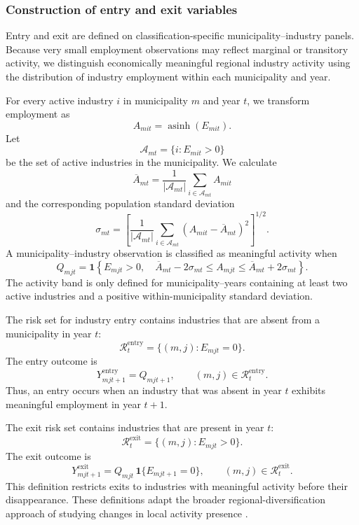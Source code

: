 \documentclass[9pt,twoside]{pnas-new}
\begin{document}
\subsubsection{Construction of entry and exit variables}
\label{subsubsec:regional_entry_exit}

Entry and exit are defined on classification-specific
municipality--industry panels. Because very small employment observations may
reflect marginal or transitory activity, we distinguish economically
meaningful regional industry activity using the distribution of industry
employment within each municipality and year.

For every active industry \(i\) in municipality \(m\) and year \(t\), we
transform employment as
\[
A_{mit}=\operatorname{asinh}(E_{mit}).
\]
Let
\[
\mathcal{A}_{mt}=\{i:E_{mit}>0\}
\]
be the set of active industries in the municipality. We calculate
\[
\overline{A}_{mt}
   =\frac{1}{|\mathcal{A}_{mt}|}
      \sum_{i\in\mathcal{A}_{mt}}A_{mit}
\]
and the corresponding population standard deviation
\[
\sigma_{mt}
   =
   \left[
   \frac{1}{|\mathcal{A}_{mt}|}
   \sum_{i\in\mathcal{A}_{mt}}
   \left(A_{mit}-\overline{A}_{mt}\right)^2
   \right]^{1/2}.
\]
A municipality--industry observation is classified as meaningful activity
when
\[
Q_{mjt}
 =
 \mathbf{1}\left\{
 E_{mjt}>0,\quad
 \overline{A}_{mt}-2\sigma_{mt}
 \leq A_{mjt}\leq
 \overline{A}_{mt}+2\sigma_{mt}
 \right\}.
\]
The activity band is only defined for municipality--years containing at least
two active industries and a positive within-municipality standard deviation.

The risk set for industry entry contains industries that are absent from a
municipality in year \(t\):
\[
\mathcal{R}^{\mathrm{entry}}_t
 =
 \{(m,j):E_{mjt}=0\}.
\]
The entry outcome is
\[
Y^{\mathrm{entry}}_{mjt+1}
 =
 Q_{mjt+1},
 \qquad
 (m,j)\in\mathcal{R}^{\mathrm{entry}}_t.
\]
Thus, an entry occurs when an industry that was absent in year \(t\) exhibits
meaningful employment in year \(t+1\).

The exit risk set contains industries that are present in year \(t\):
\[
\mathcal{R}^{\mathrm{exit}}_t
 =
 \{(m,j):E_{mjt}>0\}.
\]
The exit outcome is
\[
Y^{\mathrm{exit}}_{mjt+1}
 =
 Q_{mjt}\,
 \mathbf{1}\{E_{mjt+1}=0\},
 \qquad
 (m,j)\in\mathcal{R}^{\mathrm{exit}}_t.
\]
This definition restricts exits to industries with meaningful activity before
their disappearance. These definitions adapt the broader regional-diversification approach of studying changes in local activity presence
\cite{hidalgoProductSpaceConditions2007,boschmaRelatednessDriverRegional2017}.
\end{document}
